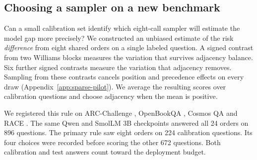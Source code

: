 \subsection{Choosing a sampler on a new benchmark}
\label{sec:pilot}
Can a small calibration set identify which eight-call sampler will
estimate the model gap more precisely? We constructed an unbiased
estimate of the risk \emph{difference} from eight shared orders on
a single labeled question. A signed contrast from two Williams
blocks measures the variation that survives adjacency balance. Six
further signed contrasts measure the variation that adjacency removes.
Sampling from these contrasts cancels position and precedence effects
on every draw (Appendix~\ref{app:sparse-pilot}). We average the
resulting scores over calibration questions and choose adjacency
when the mean is positive.

We registered this rule on ARC-Challenge \citep{clark2018},
OpenBookQA \citep{mihaylov2018}, Cosmos QA \citep{huang2019cosmos}
and RACE \citep{lai2017}. The same Qwen and SmolLM 3B checkpoints
answered all 24 orders on 896 questions. The primary rule saw eight
orders on 224 calibration questions. Its four choices were recorded
before scoring the other 672 questions. Both calibration and test
answers count toward the deployment budget.

